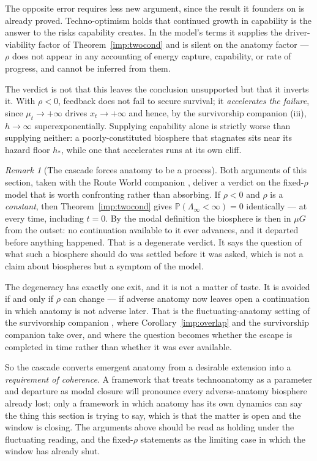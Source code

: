 \documentclass[11pt]{article}
\newcommand{\PP}{\mathbb{P}}
\theoremstyle{plain}
\theoremstyle{definition}
\theoremstyle{remark}
\newtheorem{remark}[theorem]{Remark}
\begin{document}
The opposite error requires less new argument, since the result it
founders on is already proved. Techno-optimism holds that continued growth in capability is the answer
to the risks capability creates. In the model's terms it supplies the
driver-viability factor of Theorem~\ref{imp:twocond} and is silent on
the anatomy factor --- $\rho$ does not appear in any accounting of energy
capture, capability, or rate of progress, and cannot be inferred from
them.

The verdict is not that this leaves the conclusion unsupported but that
it inverts it. With $\rho<0$, feedback does not fail to secure survival;
it \emph{accelerates the failure}, since $\mu_t\to+\infty$ drives
$x_t\to+\infty$ and hence, by
the survivorship companion \cite{SurvA}(iii), $h\to\infty$
superexponentially. Supplying capability alone is strictly worse than
supplying neither: a poorly-constituted biosphere that stagnates sits
near its hazard floor $h_\ast$, while one that accelerates runs at its
own cliff.

\begin{remark}[The cascade forces anatomy to be a process]
\label{hr:rem:forcesprocess}
Both arguments of this section, taken with
the Route World companion \cite{RouteWorld}, deliver a verdict on the fixed-$\rho$ model
that is worth confronting rather than absorbing. If $\rho<0$ and $\rho$ is a \emph{constant}, then
Theorem~\ref{imp:twocond} gives
$\PP(\Lambda_\infty<\infty)=0$ identically --- at every time, including
$t=0$. By the modal definition the biosphere is then in $\mu G$ from the
outset: no continuation available to it ever advances, and it departed
before anything happened. That is a degenerate verdict. It says the
question of what such a biosphere should do was settled before it was
asked, which is not a claim about biospheres but a symptom of the
model.

The degeneracy has exactly one exit, and it is not a matter of taste.
It is avoided if and only if $\rho$ can change --- if adverse anatomy
now leaves open a continuation in which anatomy is not adverse later.
That is the fluctuating-anatomy setting of
the survivorship companion \cite{SurvA}, where
Corollary~\ref{imp:overlap} and
the survivorship companion \cite{SurvA} take over, and where the question
becomes whether the escape is completed in time rather than whether it
was ever available.

So the cascade converts emergent anatomy from a desirable extension
into a \emph{requirement of coherence}. A framework that treats
technoanatomy as a parameter and departure as modal closure will
pronounce every adverse-anatomy biosphere already lost; only a
framework in which anatomy has its own dynamics can say the thing this
section is trying to say, which is that the matter is open and the
window is closing. The arguments above should be read as holding under
the fluctuating reading, and the fixed-$\rho$ statements as the
limiting case in which the window has already shut.
\end{remark}
\end{document}
